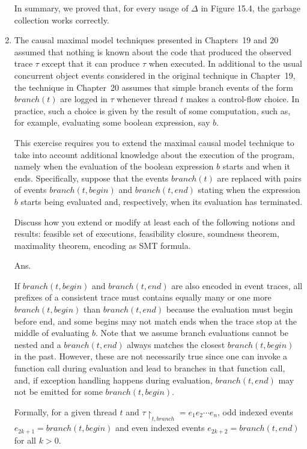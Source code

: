 \documentclass{article}
\begin{document}
\begin{enumerate}
In summary, we proved that, for every usage of $\Delta$ in Figure 15.4,
the garbage collection works correctly.

\item The causal maximal model techniques presented in Chapters~19 and 20 assumed
that nothing is known about the code that produced the observed trace $\tau$
except that it can produce $\tau$ when executed.
In additional to the usual concurrent object events considered in the original
technique in Chapter~19,
the technique in Chapter~20 assumes that simple branch events of the form 
$branch(t)$ are logged in $\tau$ whenever thread $t$ makes a control-flow choice.
 In practice, such a choice is given by the result of some computation,
such as, for example, evaluating some boolean expression, say $b$.

This exercise requires you to extend the maximal causal model technique to take
into account additional knowledge about the execution of the program,
namely when the evaluation of the boolean expression $b$ starts and when it ends.
Specifically, suppose that the events $branch(t)$ are replaced with pairs of
events $branch(t, begin)$ and $branch(t,end)$ stating when the expression $b$
starts being evaluated and, respectively, when its evaluation has terminated.

Discuss how you extend or modify at least each of the following notions and
results: feasible set of executions, feasibility closure, soundness theorem,
maximality theorem, encoding as SMT formula.

\newcommand{\Rest}{\ensuremath{\upharpoonright}}
\newcommand{\F}{\ensuremath{\mathcal{F}}}
Ans.

If $branch(t, begin)$ and $branch(t,end)$ are also encoded in event traces,
all prefixes of a consistent trace must contains equally many or one more
$branch(t, begin)$ than $branch(t, end)$ because the evaluation must begin before end,
and some begins may not match ends when the trace stop at the middle of evaluating $b$.
Note that we assume branch evaluations cannot be nested and 
a $branch(t, end)$ always matches the closest $branch(t, begin)$ in the past.
However, these are not necessarily true since one can invoke a function call during
evaluation and lead to branches in that function call,
and, if exception handling happens during evaluation, $branch(t, end)$ may not be
emitted for some $branch(t, begin)$.   

Formally, for a given thread $t$ and $\tau\Rest_{t,branch} = e_1 e_2 \cdots e_n$,
odd indexed events $e_{2k+1} = branch(t, begin)$ and even indexed events
$e_{2k+2} = branch(t, end)$ for all $k > 0$.



\end{enumerate}
\end{document}
